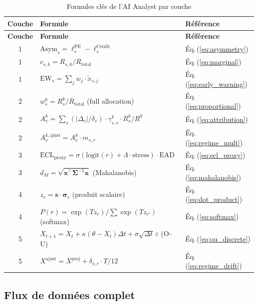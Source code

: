 \documentclass[12pt,a4paper]{article}
\begin{document}
\begin{longtable}{clp{8cm}}
\caption{Formules cl\'es de l'AI Analyst par couche} \\
\toprule
\textbf{Couche} & \textbf{Formule} & \textbf{R\'ef\'erence} \\
\midrule
\endfirsthead
\midrule
\textbf{Couche} & \textbf{Formule} & \textbf{R\'ef\'erence} \\
\midrule
\endhead
1 & $\text{Asym}_s = \ell_s^{\text{PE}} - \ell_s^{\text{Credit}}$ & \'Eq.\,(\ref{eq:asymmetry}) \\
1 & $c_{s,k} = R_{s,k} / R_{\text{total}}$ & \'Eq.\,(\ref{eq:marginal}) \\
1 & $\text{EW}_s = \sum_j w_j \cdot \tilde{x}_{s,j}$ & \'Eq.\,(\ref{eq:early_warning}) \\
\midrule
2 & $w_s^k = R_s^k / R_{\text{total}}$ (full allocation) & \'Eq.\,(\ref{eq:proportional}) \\
2 & $A_v^k = \sum_s (|\Delta_v| / \delta_v) \cdot \gamma_{s,v}^k \cdot R_s^k / R^k$ & \'Eq.\,(\ref{eq:attribution}) \\
2 & $A_v^{k,\text{ajust}} = A_v^k \cdot m_{v,r}$ & \'Eq.\,(\ref{eq:regime_mult}) \\
\midrule
3 & $\text{ECL}_{\text{proxy}} = \sigma(\text{logit}(r) + \Lambda \cdot \text{stress}) \cdot \text{EAD}$ & \'Eq.\,(\ref{eq:ecl_proxy}) \\
3 & $d_M = \sqrt{\mathbf{x}^\top \boldsymbol{\Sigma}^{-1} \mathbf{x}}$ (Mahalanobis) & \'Eq.\,(\ref{eq:mahalanobis}) \\
\midrule
4 & $z_r = \mathbf{s} \cdot \boldsymbol{\sigma}_r$ (produit scalaire) & \'Eq.\,(\ref{eq:dot_product}) \\
4 & $P(r) = \exp(T z_r) / \sum \exp(T z_{r'})$ (softmax) & \'Eq.\,(\ref{eq:softmax}) \\
\midrule
5 & $X_{t+1} = X_t + \kappa(\theta - X_t)\Delta t + \sigma\sqrt{\Delta t}\,\varepsilon$ (O-U) & \'Eq.\,(\ref{eq:ou_discrete}) \\
5 & $X^{\text{ajust}} = X^{\text{proj}} + \delta_{v,r} \cdot T/12$ & \'Eq.\,(\ref{eq:regime_drift}) \\
\bottomrule
\end{longtable}

\subsection{Flux de donn\'ees complet}
\end{document}
